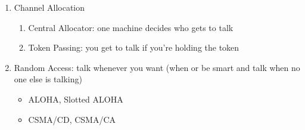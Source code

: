 \documentclass{report}
\begin{document}
\begin{problem}
\begin{answer}{42em}
\begin{enumerate}
\begin{enumerate}
      \item Channel Allocation
        \begin{enumerate}
          \item Central Allocator: one machine decides who gets to talk
          \item Token Passing: you get to talk if you're holding the token
        \end{enumerate}

      \item Random Access: talk whenever you want (when or be smart and talk
        when no one else is talking)
        \begin{itemize}
          \item ALOHA, Slotted ALOHA
          \item CSMA/CD, CSMA/CA
        \end{itemize}
    \end{enumerate}
\end{enumerate}
\end{answer}
\end{problem}
\end{document}
